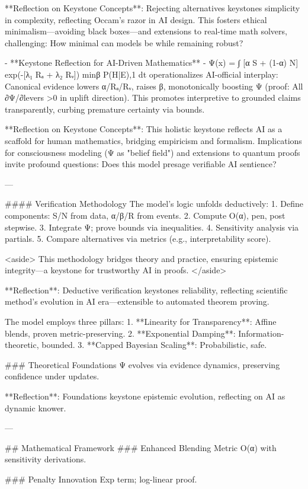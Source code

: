 **Reflection on Keystone Concepts**: Rejecting alternatives keystones simplicity in complexity, reflecting Occam's razor in AI design. This fosters ethical minimalism—avoiding black boxes—and extensions to real-time math solvers, challenging: How minimal can models be while remaining robust?

- **Keystone Reflection for AI-Driven Mathematics**
  - Ψ(x) = ∫ [α S + (1-α) N] exp(-[λ₁ Rₐ + λ₂ Rᵥ]) min{β P(H|E),1} dt operationalizes AI-official interplay: Canonical evidence lowers α/Rₐ/Rᵥ, raises β, monotonically boosting Ψ (proof: All ∂Ψ/∂levers >0 in uplift direction). This promotes interpretive to grounded claims transparently, curbing premature certainty via bounds.

**Reflection on Keystone Concepts**: This holistic keystone reflects AI as a scaffold for human mathematics, bridging empiricism and formalism. Implications for consciousness modeling (Ψ as "belief field") and extensions to quantum proofs invite profound questions: Does this model presage verifiable AI sentience?

---

#### Verification Methodology
The model's logic unfolds deductively:
1. Define components: S/N from data, α/β/R from events.
2. Compute O(α), pen, post stepwise.
3. Integrate Ψ; prove bounds via inequalities.
4. Sensitivity analysis via partials.
5. Compare alternatives via metrics (e.g., interpretability score).

<aside>
This methodology bridges theory and practice, ensuring epistemic integrity—a keystone for trustworthy AI in proofs.
</aside>

**Reflection**: Deductive verification keystones reliability, reflecting scientific method's evolution in AI era—extensible to automated theorem proving.

The model employs three pillars:
1. **Linearity for Transparency**: Affine blends, proven metric-preserving.
2. **Exponential Damping**: Information-theoretic, bounded.
3. **Capped Bayesian Scaling**: Probabilistic, safe.

### Theoretical Foundations
Ψ evolves via evidence dynamics, preserving confidence under updates.

**Reflection**: Foundations keystone epistemic evolution, reflecting on AI as dynamic knower.

---

## Mathematical Framework
### Enhanced Blending Metric
O(α) with sensitivity derivations.

### Penalty Innovation
Exp term; log-linear proof.

